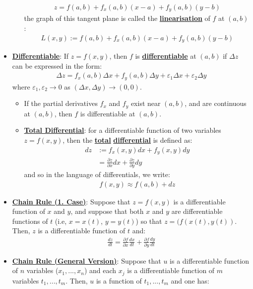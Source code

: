\documentclass[11pt]{article}
\newcommand{\dfn}[1]{\underline{\textbf{#1}}}
\begin{document}
\begin{itemize}[noitemsep]
\begin{itemize}[noitemsep]
\begin{align}
			z = f(a,b) + f_x(a,b) (x-a) + f_y(a,b) (y-b) 	
		\end{align}
		the graph of this tangent plane is called the \dfn{linearisation} of $f$ at $(a,b)$: 
		\begin{align}
			L(x,y) := f(a,b) + f_x(a,b) (x-a) + f_y(a,b) (y-b)	
		\end{align}
	\end{itemize}
	\item \dfn{Differentiable}: If $z = f(x,y)$, then $f$ is \dfn{differentiable} at $(a,b)$ if $\Delta z$ can be expressed in the form: 
	\begin{align}
		\Delta z = f_x (a,b) \Delta x + f_y (a,b) \Delta y + \varepsilon_1 \Delta x + \varepsilon_2 \Delta y	
	\end{align}
	where $\varepsilon_1, \varepsilon_2 \rightarrow 0$ as $(\Delta x, \Delta y) \rightarrow  (0,0)$.
	\begin{itemize}[noitemsep]
		\item If the partial derivatives $f_x$ and $f_y$ exist near $(a,b)$, and are continuous at $(a,b)$, then $f$ is differentiable at $(a,b)$.
		\item \dfn{Total Differential}: for a differentiable function of two variables $z = f(x,y)$, then the \dfn{total} \dfn{differential} is defined as: 
		\begin{align*}
			dz & := f_x (x,y) dx + f_y (x,y) dy 	\\
			   & = \frac{\partial z}{\partial x} dx + \frac{\partial z}{\partial y} dy
		\end{align*} 
		and so in the language of differentials, we write: 
		\begin{align*}
			f(x,y) \approx f(a,b) + dz
		\end{align*}
	\end{itemize}
	\item \dfn{Chain Rule (1. Case)}: Suppose that $z= f(x,y)$ is a differentiable function of $x$ and $y$, and suppose that both $x$ and $y$ are differentiable functions of $t$ (i.e, $x=x(t)$, $y=y(t)$) so that $z = (f(x(t), y(t))$. Then, $z$ is a differentiable function of $t$ and: 
	\begin{align}
		\frac{dz}{dt} = \frac{\partial f}{\partial x} \frac{dx}{dt} + \frac{\partial f}{\partial y}\frac{dy}{dt}	
	\end{align}
	\item \dfn{Chain Rule (General Version)}: Suppose that $u$ is a differentiable function of $n$ variables ($x_1, ..., x_n$) and each $x_j$ is a differentiable function of $m$ variables $t_1, ..., t_m$. Then, $u$ is a function of $t_1, ..., t_m$ and one has: 

\end{itemize}
\end{document}
